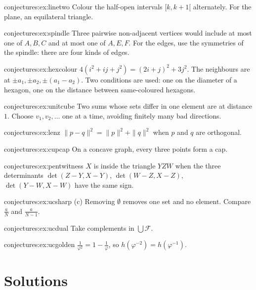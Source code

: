 \begin{hint}{conjectures:ex:linetwo}
Colour the half-open intervals $[k,k+1[$ alternately. For the plane, an equilateral triangle.
\end{hint}
\begin{hint}{conjectures:ex:spindle}
Three pairwise non-adjacent vertices would include at most one of $A,B,C$ and at most one of $A,E,F$. For the edges, use the symmetries of the spindle:
there are four kinds of edges.
\end{hint}
\begin{hint}{conjectures:ex:hexcolour}
$4(i^2+ij+j^2)=(2i+j)^2+3j^2$.
The neighbours are at $\pm a_1,\pm a_2,\pm(a_1-a_2)$. Two conditions are used: one on the diameter of a hexagon, one on the distance between
same-coloured hexagons.
\end{hint}
\begin{hint}{conjectures:ex:unitcube}
Two sums whose sets differ in one element are at distance $1$. Choose $v_1,v_2,\dots$ one at a time, avoiding finitely many bad directions.
\end{hint}
\begin{hint}{conjectures:ex:lenz}
$\|p-q\|^2=\|p\|^2+\|q\|^2$ when $p$ and $q$ are orthogonal.
\end{hint}
\begin{hint}{conjectures:ex:cupcap}
On a concave graph, every three points form a cap.
\end{hint}
\begin{hint}{conjectures:ex:pentwitness}
$X$ is inside the triangle $YZW$ when the three determinants $\det(Z-Y,X-Y)$, $\det(W-Z,X-Z)$, $\det(Y-W,X-W)$ have the same sign.
\end{hint}
\begin{hint}{conjectures:ex:ucsharp}
(c) Removing $\emptyset$ removes one set and no element. Compare $\frac aN$ and $\frac a{N-1}$.
\end{hint}
\begin{hint}{conjectures:ex:ucdual}
Take complements in $\bigcup\mathcal F$.
\end{hint}
\begin{hint}{conjectures:ex:ucgolden}
$\frac1{\varphi^2}=1-\frac1\varphi$, so $h(\varphi^{-2})=h(\varphi^{-1})$.
\end{hint}

\section{Solutions}

